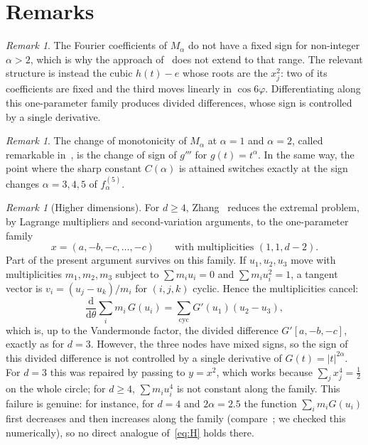 \documentclass[11pt]{amsart}
\theoremstyle{remark}
\newtheorem{remark}[theorem]{Remark}
\begin{document}
\section{Remarks}

\begin{remark}
The Fourier coefficients of $M_\alpha$ do not have a fixed sign for non-integer
$\alpha>2$, which is why the approach of~\cite{HU} does not extend to that range. The
relevant structure is instead the cubic $h(t)-e$ whose roots are the $x_j^2$: two of its
coefficients are fixed and the third moves linearly in $\cos6\varphi$. Differentiating
along this one-parameter family produces divided differences, whose sign is controlled
by a single derivative.
\end{remark}

\begin{remark}
The change of monotonicity of $M_\alpha$ at $\alpha=1$ and $\alpha=2$, called remarkable
in~\cite{HU}, is the change of sign of $g'''$ for $g(t)=t^\alpha$. In the same way, the
point where the sharp constant $C(\alpha)$ is attained switches exactly at the sign
changes $\alpha=3,4,5$ of $f_\alpha^{(5)}$.
\end{remark}

\begin{remark}[Higher dimensions]
For $d\ge4$, Zhang~\cite{Z} reduces the extremal problem, by Lagrange multipliers and
second-variation arguments, to the one-parameter family
\[
x=(a,-b,-c,\dots,-c)\qquad\text{with multiplicities }(1,1,d-2).
\]
Part of the present argument survives on this family. If $u_1,u_2,u_3$ move with multiplicities $m_1,m_2,m_3$ subject to
$\sum m_iu_i=0$ and $\sum m_iu_i^2=1$, a tangent vector is $v_i=(u_j-u_k)/m_i$ for
$(i,j,k)$ cyclic. Hence the multiplicities cancel:
\[
\frac{\mathrm d}{\mathrm d\theta}\sum_i m_i\,G(u_i)=\sum_{\mathrm{cyc}}G'(u_1)(u_2-u_3),
\]
which is, up to the Vandermonde factor, the divided difference $G'[a,-b,-c]$, exactly as
for $d=3$. However, the three nodes have mixed signs, so the sign of this divided
difference is not controlled by a single derivative of $G(t)=|t|^{2\alpha}$. For $d=3$ this
was repaired by passing to $y=x^2$, which works because $\sum_j x_j^4=\frac12$ on the whole
circle; for $d\ge4$, $\sum m_iu_i^4$ is not constant along the family. This failure is
genuine: for instance, for $d=4$ and $2\alpha=2.5$ the function $\sum_i m_iG(u_i)$ first
decreases and then increases along the family (compare~\cite[Lemma~11(2)]{Z}; we checked
this numerically), so no direct analogue of~\eqref{eq:H} holds there.
\end{remark}
\end{document}
